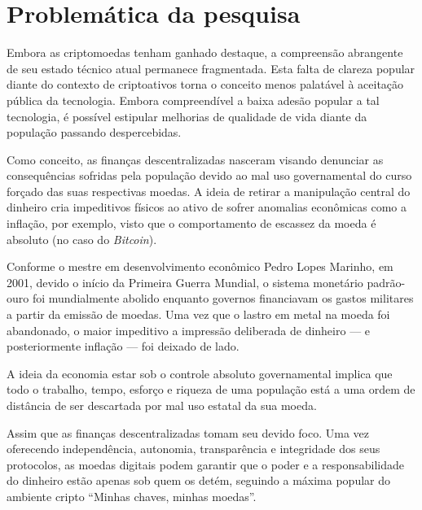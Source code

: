 \chapter{Problemática da pesquisa}



Embora as criptomoedas tenham ganhado destaque, a compreensão abrangente de seu estado técnico atual permanece fragmentada. Esta falta de clareza popular diante do contexto de criptoativos torna o conceito menos palatável à aceitação pública da tecnologia. Embora compreendível a baixa adesão popular a tal tecnologia, é possível estipular melhorias de qualidade de vida diante da população passando despercebidas.

Como conceito, as finanças descentralizadas nasceram visando denunciar as consequências sofridas pela população devido ao mal uso governamental do curso forçado das suas respectivas moedas. A ideia de retirar a manipulação central do dinheiro cria impeditivos físicos ao ativo de sofrer anomalias econômicas como a inflação, por exemplo, visto que o comportamento de escassez da moeda é absoluto (no caso do \textit{Bitcoin}).

Conforme o mestre em desenvolvimento econômico Pedro Lopes Marinho, em 2001, devido o início da Primeira Guerra Mundial, o sistema monetário padrão-ouro foi mundialmente abolido enquanto governos financiavam os gastos militares a partir da emissão de moedas. Uma vez que o lastro em metal na moeda foi abandonado, o maior impeditivo a impressão deliberada de dinheiro — e posteriormente inflação — foi deixado de lado.

A ideia da economia estar sob o controle absoluto governamental implica que todo o trabalho, tempo, esforço e riqueza de uma população está a uma ordem de distância de ser descartada por mal uso estatal da sua moeda. 

Assim que as finanças descentralizadas tomam seu devido foco. Uma vez oferecendo independência, autonomia, transparência e integridade dos seus protocolos, as moedas digitais podem garantir que o poder e a responsabilidade do dinheiro estão apenas sob quem os detém, seguindo a máxima popular do ambiente cripto ``Minhas chaves, minhas moedas''.
